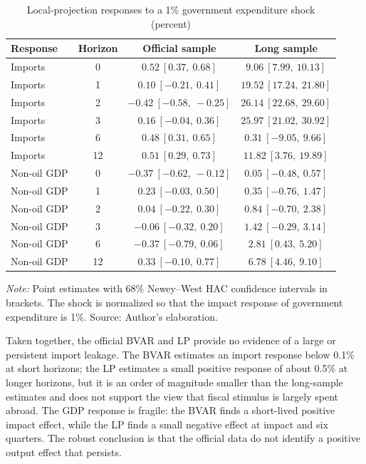 \documentclass[11pt,a4paper]{article}
\begin{document}
\begin{table}[htbp]
\centering
\small
\caption{Local-projection responses to a 1\% government expenditure shock (percent)}
\label{tab:lp_elasticities}
\begin{tabular}{@{}lccc@{}}
\toprule
Response & Horizon & Official sample & Long sample \\
\midrule
Imports & 0 & $0.52\ [0.37,\ 0.68]$ & $9.06\ [7.99,\ 10.13]$ \\
Imports & 1 & $0.10\ [-0.21,\ 0.41]$ & $19.52\ [17.24,\ 21.80]$ \\
Imports & 2 & $-0.42\ [-0.58,\ -0.25]$ & $26.14\ [22.68,\ 29.60]$ \\
Imports & 3 & $0.16\ [-0.04,\ 0.36]$ & $25.97\ [21.02,\ 30.92]$ \\
Imports & 6 & $0.48\ [0.31,\ 0.65]$ & $0.31\ [-9.05,\ 9.66]$ \\
Imports & 12 & $0.51\ [0.29,\ 0.73]$ & $11.82\ [3.76,\ 19.89]$ \\
Non-oil GDP & 0 & $-0.37\ [-0.62,\ -0.12]$ & $0.05\ [-0.48,\ 0.57]$ \\
Non-oil GDP & 1 & $0.23\ [-0.03,\ 0.50]$ & $0.35\ [-0.76,\ 1.47]$ \\
Non-oil GDP & 2 & $0.04\ [-0.22,\ 0.30]$ & $0.84\ [-0.70,\ 2.38]$ \\
Non-oil GDP & 3 & $-0.06\ [-0.32,\ 0.20]$ & $1.42\ [-0.29,\ 3.14]$ \\
Non-oil GDP & 6 & $-0.37\ [-0.79,\ 0.06]$ & $2.81\ [0.43,\ 5.20]$ \\
Non-oil GDP & 12 & $0.33\ [-0.10,\ 0.77]$ & $6.78\ [4.46,\ 9.10]$ \\
\bottomrule
\end{tabular}
\par\vspace{0.3em}
\begin{minipage}{0.95\textwidth}
\footnotesize\textit{Note:} Point estimates with 68\% Newey--West HAC confidence intervals in brackets. The shock is normalized so that the impact response of government expenditure is 1\%. Source: Author's elaboration.
\end{minipage}
\end{table}

Taken together, the official BVAR and LP provide no evidence of a large or persistent import leakage. The BVAR estimates an import response below 0.1\% at short horizons; the LP estimates a small positive response of about 0.5\% at longer horizons, but it is an order of magnitude smaller than the long-sample estimates and does not support the view that fiscal stimulus is largely spent abroad. The GDP response is fragile: the BVAR finds a short-lived positive impact effect, while the LP finds a small negative effect at impact and six quarters. The robust conclusion is that the official data do not identify a positive output effect that persists.
\end{document}

